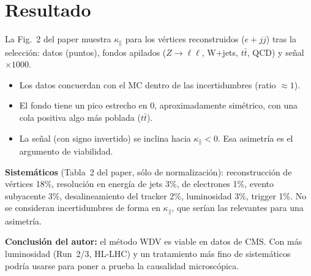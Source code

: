 \documentclass[11pt,a4paper]{article}
\newcommand{\kpar}{\kappa_{\parallel}}
\begin{document}
\section{Resultado}
La Fig.~2 del paper muestra $\kpar$ para los vértices reconstruidos ($e+jj$) tras la selección: datos (puntos), fondos apilados ($Z\to\ell\ell$, W+jets, $t\bar t$, QCD) y señal $\times1000$.
\begin{itemize}
\item Los datos concuerdan con el MC dentro de las incertidumbres (ratio $\approx1$).
\item El fondo tiene un pico estrecho en 0, aproximadamente simétrico, con una cola positiva algo más poblada ($t\bar t$).
\item La señal (con signo invertido) se inclina hacia $\kpar<0$. Esa asimetría es el argumento de viabilidad.
\end{itemize}

\textbf{Sistemáticos} (Tabla~2 del paper, sólo de normalización): reconstrucción de vértices 18\%, resolución en energía de jets 3\%, de electrones 1\%, evento subyacente 3\%, desalineamiento del tracker 2\%, luminosidad 3\%, trigger 1\%. No se consideran incertidumbres de forma en $\kpar$, que serían las relevantes para una asimetría.

\textbf{Conclusión del autor:} el método WDV es viable en datos de CMS. Con más luminosidad (Run~2/3, HL-LHC) y un tratamiento más fino de sistemáticos podría usarse para poner a prueba la causalidad microscópica.

\end{document}
